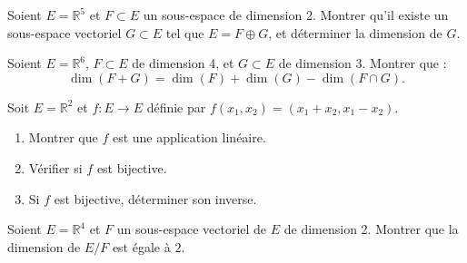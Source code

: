 \begin{exercice}
Soient \( E = \mathbb{R}^5 \) et \( F \subset E \) un sous-espace de dimension 2. Montrer qu’il existe un sous-espace vectoriel \( G \subset E \) tel que \( E = F \oplus G \), et déterminer la dimension de \( G \).
\end{exercice}

\begin{exercice}
Soient \( E = \mathbb{R}^6 \), \( F \subset E \) de dimension 4, et \( G \subset E \) de dimension 3. Montrer que :
\[
\dim(F + G) = \dim(F) + \dim(G) - \dim(F \cap G).
\]
\end{exercice}

\begin{exercice}
Soit \( E = \mathbb{R}^2 \) et \( f : E \to E \) définie par \( f(x_1, x_2) = (x_1 + x_2, x_1 - x_2) \).
\begin{enumerate}
    \item Montrer que \( f \) est une application linéaire.
    \item Vérifier si \( f \) est bijective.
    \item Si \( f \) est bijective, déterminer son inverse.
\end{enumerate}
\end{exercice}

\begin{exercice}
Soient \( E = \mathbb{R}^4 \) et \( F \) un sous-espace vectoriel de \( E \) de dimension 2. Montrer que la dimension de \( E/F \) est égale à \( 2 \).
\end{exercice}
